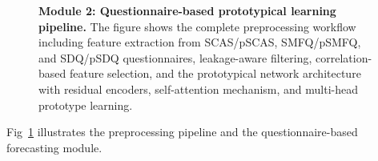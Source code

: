 \documentclass[10pt,letterpaper]{article}
\begin{document}
                                                                        \begin{figure}[!ht]
                                                                        \caption{\textbf{Module 2: Questionnaire-based prototypical learning pipeline.}
                                                                        The figure shows the complete preprocessing workflow including feature extraction from SCAS/pSCAS, SMFQ/pSMFQ, and SDQ/pSDQ questionnaires, leakage-aware filtering, correlation-based feature selection, and the prototypical network architecture with residual encoders, self-attention mechanism, and multi-head prototype learning.}
                                                                        \label{fig:module2}
                                                                        \end{figure}

                                                                        Fig~\ref{fig:module2} illustrates the preprocessing pipeline and the questionnaire-based forecasting module.
\end{document}
